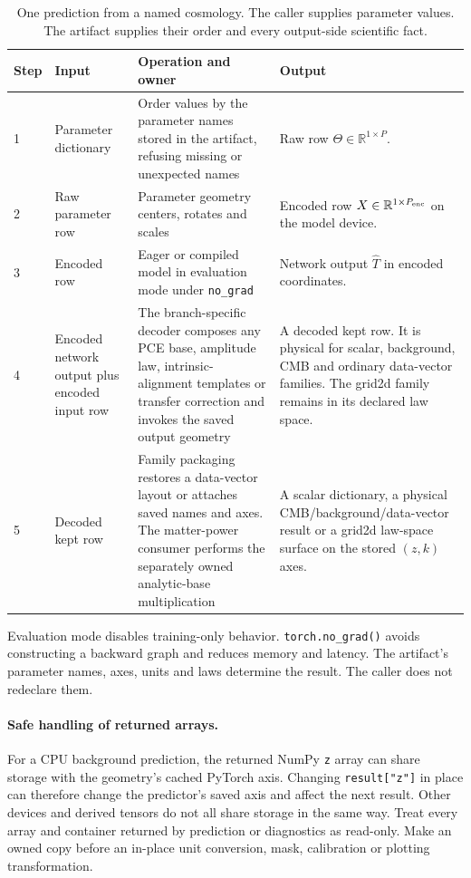 \documentclass[10pt,aps,prd,twocolumn,nofootinbib]{revtex4-2}
\newcommand{\code}[1]{\texttt{#1}}
\begin{document}
\begin{table}[t]
\centering
\begin{tabular}{p{}p{}p{}p{}}
\toprule
Step & Input & Operation and owner & Output \\
\midrule
1 & Parameter dictionary & Order values by the parameter names stored in the
artifact, refusing missing or unexpected names & Raw row
$\Theta\in\mathbb{R}^{1\times P}$.  \\
2 & Raw parameter row & Parameter geometry centers, rotates and scales &
Encoded row $X\in\mathbb{R}^{1\times P_{\rm enc}}$ on the model device.  \\
3 & Encoded row & Eager or compiled model in evaluation mode under
\code{no\_grad} & Network output $\widehat T$ in encoded coordinates.  \\
4 & Encoded network output plus encoded input row & The branch-specific
decoder composes any PCE base, amplitude law, intrinsic-alignment templates
or transfer correction and invokes the saved output geometry & A decoded kept
row.  It is physical for scalar, background, CMB and ordinary data-vector
families.  The grid2d family remains in its declared law space.  \\
5 & Decoded kept row & Family packaging restores a data-vector layout or
attaches saved names and axes.  The matter-power consumer performs the
separately owned analytic-base multiplication & A scalar dictionary, a
physical CMB/background/data-vector result or a grid2d law-space surface on
the stored $(z,k)$ axes.  \\
\bottomrule
\end{tabular}
\caption{One prediction from a named cosmology.  The caller supplies parameter
values.  The artifact supplies their order and every output-side scientific
fact.}
\label{tab:prediction-trace}
\end{table}

Evaluation mode disables training-only behavior.  \code{torch.no\_grad()}
avoids constructing a backward graph and reduces memory and latency.  The
artifact's parameter names, axes, units and laws determine the result.  The
caller does not redeclare them.

\paragraph{Safe handling of returned arrays.}
For a CPU background prediction, the returned NumPy \code{z} array can share
storage with the geometry's cached PyTorch axis.  Changing
\code{result["z"]} in place can therefore change the predictor's saved axis
and affect the next result.  Other devices and derived tensors do not all share
storage in the same way.  Treat every array and container returned by
prediction or diagnostics as read-only.  Make an owned copy before an in-place
unit conversion, mask, calibration or plotting transformation.
\end{document}
